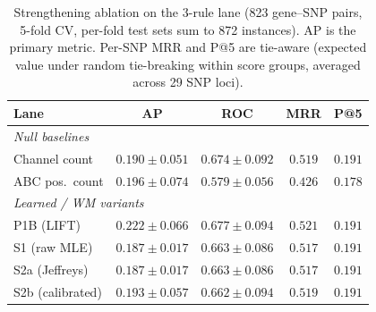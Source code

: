 \documentclass[]{article}
\begin{document}
\begin{table}[t]
\centering
\caption{Strengthening ablation on the 3-rule lane (823 gene--SNP
  pairs, 5-fold CV, per-fold test sets sum to 872 instances).
  AP is the primary metric.
  Per-SNP MRR and P@5 are tie-aware (expected value under random
  tie-breaking within score groups, averaged across 29 SNP loci).}
\label{tab:strengthening}
\begin{tabular}{@{}lcccc@{}}
\toprule
\textbf{Lane} & \textbf{AP} & \textbf{ROC} & \textbf{MRR} & \textbf{P@5} \\
\midrule
\multicolumn{5}{l}{\emph{Null baselines}} \\
\quad Channel count     & $0.190 \pm 0.051$ & $0.674 \pm 0.092$ & $0.519$ & $0.191$ \\
\quad ABC pos.\ count   & $0.196 \pm 0.074$ & $0.579 \pm 0.056$ & $0.426$ & $0.178$ \\
\midrule
\multicolumn{5}{l}{\emph{Learned / WM variants}} \\
\quad P1B (LIFT)        & $0.222 \pm 0.066$ & $0.677 \pm 0.094$ & $0.521$ & $0.191$ \\
\quad S1 (raw MLE)      & $0.187 \pm 0.017$ & $0.663 \pm 0.086$ & $0.517$ & $0.191$ \\
\quad S2a (Jeffreys)    & $0.187 \pm 0.017$ & $0.663 \pm 0.086$ & $0.517$ & $0.191$ \\
\quad S2b (calibrated)  & $0.193 \pm 0.057$ & $0.662 \pm 0.094$ & $0.519$ & $0.191$ \\
\bottomrule
\end{tabular}
\end{table}
\end{document}
